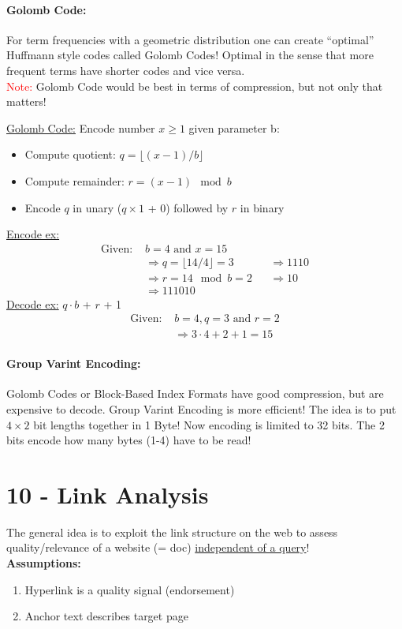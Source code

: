 \documentclass[a4paper,11pt]{article}
\newcommand{\msection}[1]{\section{#1}\vspace{-0.5mm}}
\begin{document}
\begin{multicols}{2}
\paragraph{Golomb Code:} For term frequencies with a geometric distribution one can create ``optimal'' Huffmann style codes called Golomb Codes! Optimal in the sense that more frequent terms have shorter codes and vice versa. \\
\textcolor{red}{Note:} Golomb Code would be best in terms of compression, but not only that matters!
\begin{addmargin}[0.28cm]{0cm} %
  \underline{Golomb Code:} Encode number $x \geq 1$ given parameter b:
  \begin{itemize}
    \item Compute quotient: $q = \lfloor (x-1)/b \rfloor$
    \item Compute remainder: $r = (x-1) \mod b$
    \item Encode $q$ in unary ($q \times 1$ + 0) followed by $r$ in binary
  \end{itemize}
  \underline{Encode ex:}
  \begin{align*}
    \text{Given: } &b = 4 \text{ and } x = 15 \\
                   &\Rightarrow q = \lfloor 14 / 4 \rfloor = 3 &&\Rightarrow 1110\\
                   &\Rightarrow r = 14 \mod b = 2 &&\Rightarrow 10 \\
                   &\Rightarrow 111010
  \end{align*}
  \underline{Decode ex:} $q \cdot b$ + $r$ + 1
  \begin{align*}
    \text{Given: } &b = 4, q = 3 \text{ and } r = 2 \\
                  &\Rightarrow 3 \cdot 4 + 2 + 1 = 15
  \end{align*}
\end{addmargin}

\paragraph{Group Varint Encoding:} Golomb Codes or Block-Based Index Formats have good compression, but are expensive to decode. Group Varint Encoding is more efficient! The idea is to put $4 \times 2$ bit lengths together in 1 Byte! Now encoding is limited to 32 bits. The 2 bits encode how many bytes (1-4) have to be read!

\msection{10 - Link Analysis}
The general idea is to exploit the link structure on the web to assess quality/relevance of a website (= doc) \underline{independent of a query}!\\
\textbf{Assumptions:}
\begin{enumerate}
  \item Hyperlink is a quality signal (endorsement)
  \item Anchor text describes target page
\end{enumerate}


\end{multicols}
\end{document}
